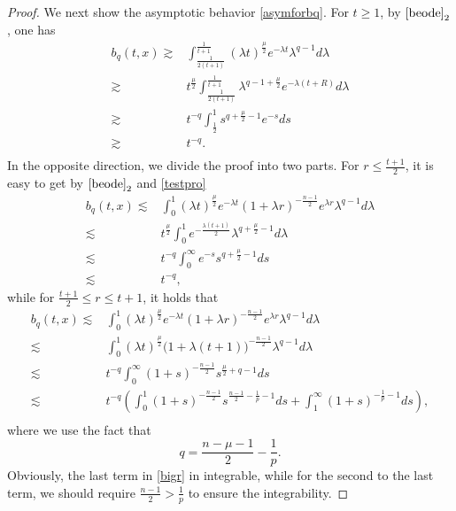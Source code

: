 \documentclass[review]{elsarticle}
\newtheorem{proof}{Proof}[section]
\begin{document}
\begin{proof}
We next show the asymptotic behavior \eqref{asymforbq}. For $t\ge 1$, by $\eqref{beode}_2$, one has
\begin{equation}\label{l43}
\begin{aligned}
b_q(t, x)\gtrsim& \int_{\frac{1}{2(t+1)}}^{\frac{1}{t+1}}(\lambda t)^{\frac{\mu}{2}}
e^{-\lambda t}\lambda^{q-1}d\lambda\\
\gtrsim& t^{\frac{\mu}2}\int_{\frac{1}{2(t+1)}}^{\frac{1}{t+1}}\lambda^{q-1+\frac{\mu}{2}}
e^{-\lambda (t+R)}d\lambda\\
\gtrsim& t^{-q}\int_{\frac12}^1s^{q+\frac {\mu}{2}-1}e^{-s}ds\\
\gtrsim& t^{-q}.\\
\end{aligned}
\end{equation}
In the opposite direction, we divide the proof into two parts. For $r\le \frac{t+1}{2}$, it is easy to get by $\eqref{beode}_2$ and \eqref{testpro}
\begin{equation}\label{l44}
\begin{aligned}
b_q(t, x)\lesssim& \int_0^1(\lambda t)^{\frac{\mu}2}e^{-\lambda t}(1+\lambda r)^{-\frac{n-1}2}e^{\lambda r}\lambda^{q-1}d\lambda\\
\lesssim&t^{\frac{\mu}2}\int_0^1e^{-\frac{\lambda(t+1)}{2}}
\lambda^{q+\frac{\mu}2-1}d\lambda\\
\lesssim&t^{-q}\int_0^{\infty}e^{-s}s^{q+\frac{\mu}{2}-1}ds\\
\lesssim&t^{-q},
\end{aligned}
\end{equation}
while for $\frac{t+1}{2}\le r\le t+1$, it holds that
\begin{equation}\label{bigr}
\begin{aligned}
b_q(t, x)\lesssim& \int_0^1(\lambda t)^{\frac{\mu}2}e^{-\lambda t}(1+\lambda r)^{-\frac{n-1}2}e^{\lambda r}\lambda^{q-1}d\lambda\\
\lesssim&\int_0^1(\lambda t)^{\frac \mu 2}\bigg(1+\lambda(t+1)\bigg)^{-\frac{n-1}{2}}\lambda^{q-1} d\lambda\\
\lesssim&t^{-q}\int_0^{\infty}(1+s)^{-\frac{n-1}{2}}s^{\frac \mu 2+q-1}ds\\
\lesssim&t^{-q}\left(\int_0^{1}(1+s)^{-\frac{n-1}{2}}s^{\frac{n-1}2-\frac 1p-1}ds+\int_1^{\infty}(1+s)^{-\frac 1p-1}ds\right),\\
\end{aligned}
\end{equation}
where we use the fact that
\[
q=\frac{n-\mu-1}{2}-\frac{1}{p}.
\]
Obviously, the last term in \eqref{bigr} in integrable, while for the second to the last term, we should require $\frac{n-1}{2}>\frac 1p$ to ensure the integrability.

\end{proof}
\end{document}
